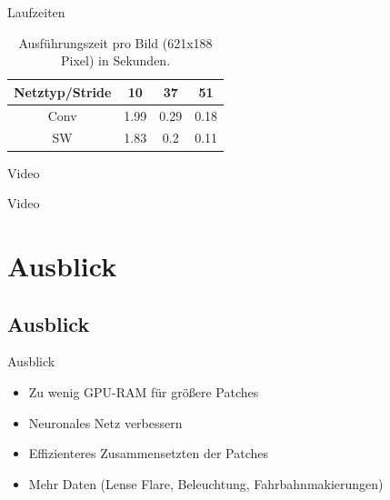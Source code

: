 \begin{frame}{Laufzeiten}

            \begin{table}[h!]
  \begin{center}

    \begin{tabular}{c||c|c|c}
      Netztyp/Stride & 10 & 37 & 51\\
      \hline
      \hline
      Conv & 1.99 & 0.29 & 0.18 \\
      SW & 1.83 & 0.2 & 0.11\\
    \end{tabular}
        \caption{Ausf\"uhrungszeit pro Bild (621x188 Pixel) in Sekunden.}
  \end{center}
\end{table}

\end{frame}

\begin{frame}{Video}

      Video

\end{frame}

\section{Ausblick}
\subsection{Ausblick}
\begin{frame}{Ausblick}
    \begin{itemize}
        \item Zu wenig GPU-RAM f\"ur gr\"o\ss ere Patches
        \item Neuronales Netz verbessern
        \item Effizienteres Zusammensetzten der Patches
        \item Mehr Daten (Lense Flare, Beleuchtung, Fahrbahnmakierungen)
    \end{itemize}

\end{frame}